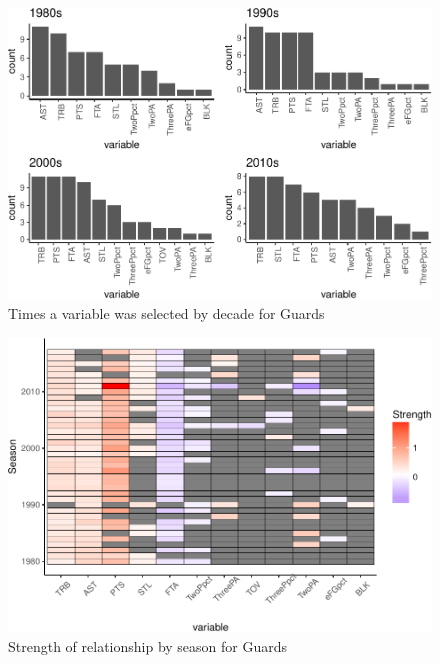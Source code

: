 \documentclass[]{elsarticle} %
\makeatletter
\def\maxwidth{\ifdim\Gin@nat@width>\linewidth\linewidth
\else\Gin@nat@width\fi}
\let\Oldincludegraphics\includegraphics
\renewcommand{\includegraphics}[1]{\Oldincludegraphics[width=\maxwidth]{#1}}
\makeatother
\begin{document}
\begin{figure}[htbp]
\centering
\includegraphics{Coaching_Selection_files/figure-latex/unnamed-chunk-14-1.pdf}
\caption{Times a variable was selected by decade for Guards}
\end{figure}

\begin{figure}[htbp]
\centering
\includegraphics{Coaching_Selection_files/figure-latex/unnamed-chunk-15-1.pdf}
\caption{Strength of relationship by season for Guards}
\end{figure}
\end{document}
